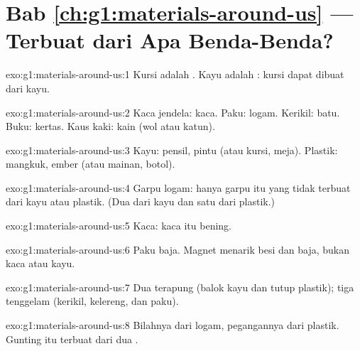 \section*{Bab \ref{ch:g1:materials-around-us} --- Terbuat dari Apa Benda-Benda?}

\begin{solution}{exo:g1:materials-around-us:1}
Kursi adalah . Kayu adalah : kursi dapat dibuat dari kayu.
\end{solution}

\begin{solution}{exo:g1:materials-around-us:2}
Kaca jendela: kaca. Paku: logam. Kerikil: batu. Buku: kertas. Kaus
kaki: kain (wol atau katun).
\end{solution}

\begin{solution}{exo:g1:materials-around-us:3}
Kayu: pensil, pintu (atau kursi, meja). Plastik: mangkuk, ember (atau
mainan, botol).
\end{solution}

\begin{solution}{exo:g1:materials-around-us:4}
Garpu logam: hanya garpu itu yang tidak terbuat dari kayu atau plastik.
(Dua  dari kayu dan satu dari plastik.)
\end{solution}

\begin{solution}{exo:g1:materials-around-us:5}
Kaca: kaca itu bening.
\end{solution}

\begin{solution}{exo:g1:materials-around-us:6}
Paku baja. Magnet menarik besi dan baja, bukan kaca atau kayu.
\end{solution}

\begin{solution}{exo:g1:materials-around-us:7}
Dua  terapung (balok kayu dan tutup plastik); tiga tenggelam
(kerikil, kelereng, dan paku).
\end{solution}

\begin{solution}{exo:g1:materials-around-us:8}
Bilahnya dari logam, pegangannya dari plastik. Gunting itu terbuat dari
dua .
\end{solution}

